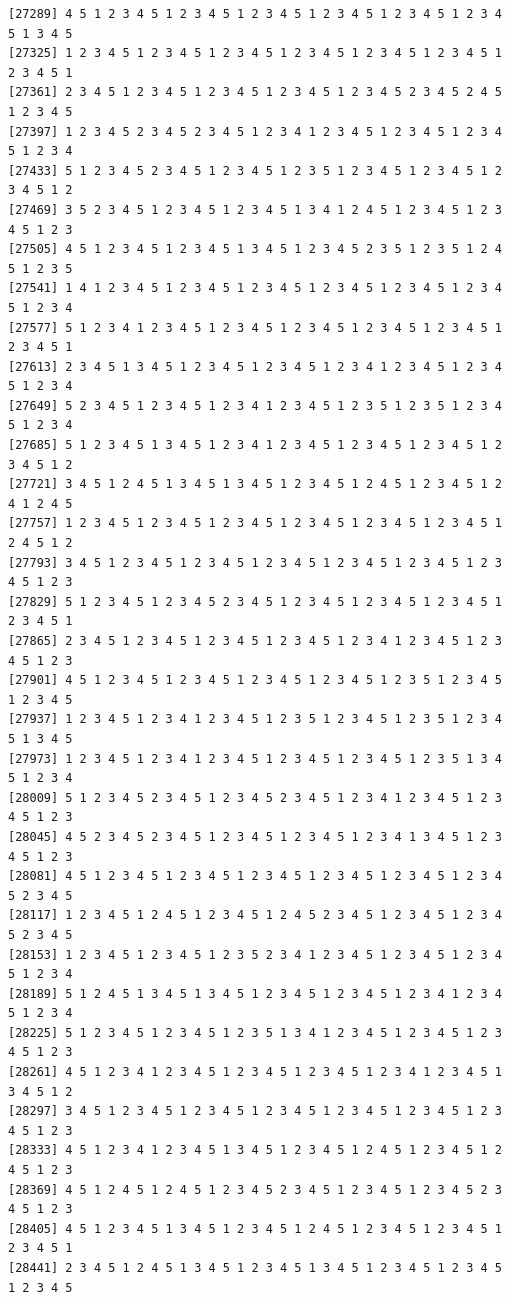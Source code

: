 \documentclass[
  11pt,
]{book}
\begin{document}
\begin{verbatim}
[27289] 4 5 1 2 3 4 5 1 2 3 4 5 1 2 3 4 5 1 2 3 4 5 1 2 3 4 5 1 2 3 4 5 1 3 4 5
[27325] 1 2 3 4 5 1 2 3 4 5 1 2 3 4 5 1 2 3 4 5 1 2 3 4 5 1 2 3 4 5 1 2 3 4 5 1
[27361] 2 3 4 5 1 2 3 4 5 1 2 3 4 5 1 2 3 4 5 1 2 3 4 5 2 3 4 5 2 4 5 1 2 3 4 5
[27397] 1 2 3 4 5 2 3 4 5 2 3 4 5 1 2 3 4 1 2 3 4 5 1 2 3 4 5 1 2 3 4 5 1 2 3 4
[27433] 5 1 2 3 4 5 2 3 4 5 1 2 3 4 5 1 2 3 5 1 2 3 4 5 1 2 3 4 5 1 2 3 4 5 1 2
[27469] 3 5 2 3 4 5 1 2 3 4 5 1 2 3 4 5 1 3 4 1 2 4 5 1 2 3 4 5 1 2 3 4 5 1 2 3
[27505] 4 5 1 2 3 4 5 1 2 3 4 5 1 3 4 5 1 2 3 4 5 2 3 5 1 2 3 5 1 2 4 5 1 2 3 5
[27541] 1 4 1 2 3 4 5 1 2 3 4 5 1 2 3 4 5 1 2 3 4 5 1 2 3 4 5 1 2 3 4 5 1 2 3 4
[27577] 5 1 2 3 4 1 2 3 4 5 1 2 3 4 5 1 2 3 4 5 1 2 3 4 5 1 2 3 4 5 1 2 3 4 5 1
[27613] 2 3 4 5 1 3 4 5 1 2 3 4 5 1 2 3 4 5 1 2 3 4 1 2 3 4 5 1 2 3 4 5 1 2 3 4
[27649] 5 2 3 4 5 1 2 3 4 5 1 2 3 4 1 2 3 4 5 1 2 3 5 1 2 3 5 1 2 3 4 5 1 2 3 4
[27685] 5 1 2 3 4 5 1 3 4 5 1 2 3 4 1 2 3 4 5 1 2 3 4 5 1 2 3 4 5 1 2 3 4 5 1 2
[27721] 3 4 5 1 2 4 5 1 3 4 5 1 3 4 5 1 2 3 4 5 1 2 4 5 1 2 3 4 5 1 2 4 1 2 4 5
[27757] 1 2 3 4 5 1 2 3 4 5 1 2 3 4 5 1 2 3 4 5 1 2 3 4 5 1 2 3 4 5 1 2 4 5 1 2
[27793] 3 4 5 1 2 3 4 5 1 2 3 4 5 1 2 3 4 5 1 2 3 4 5 1 2 3 4 5 1 2 3 4 5 1 2 3
[27829] 5 1 2 3 4 5 1 2 3 4 5 2 3 4 5 1 2 3 4 5 1 2 3 4 5 1 2 3 4 5 1 2 3 4 5 1
[27865] 2 3 4 5 1 2 3 4 5 1 2 3 4 5 1 2 3 4 5 1 2 3 4 1 2 3 4 5 1 2 3 4 5 1 2 3
[27901] 4 5 1 2 3 4 5 1 2 3 4 5 1 2 3 4 5 1 2 3 4 5 1 2 3 5 1 2 3 4 5 1 2 3 4 5
[27937] 1 2 3 4 5 1 2 3 4 1 2 3 4 5 1 2 3 5 1 2 3 4 5 1 2 3 5 1 2 3 4 5 1 3 4 5
[27973] 1 2 3 4 5 1 2 3 4 1 2 3 4 5 1 2 3 4 5 1 2 3 4 5 1 2 3 5 1 3 4 5 1 2 3 4
[28009] 5 1 2 3 4 5 2 3 4 5 1 2 3 4 5 2 3 4 5 1 2 3 4 1 2 3 4 5 1 2 3 4 5 1 2 3
[28045] 4 5 2 3 4 5 2 3 4 5 1 2 3 4 5 1 2 3 4 5 1 2 3 4 1 3 4 5 1 2 3 4 5 1 2 3
[28081] 4 5 1 2 3 4 5 1 2 3 4 5 1 2 3 4 5 1 2 3 4 5 1 2 3 4 5 1 2 3 4 5 2 3 4 5
[28117] 1 2 3 4 5 1 2 4 5 1 2 3 4 5 1 2 4 5 2 3 4 5 1 2 3 4 5 1 2 3 4 5 2 3 4 5
[28153] 1 2 3 4 5 1 2 3 4 5 1 2 3 5 2 3 4 1 2 3 4 5 1 2 3 4 5 1 2 3 4 5 1 2 3 4
[28189] 5 1 2 4 5 1 3 4 5 1 3 4 5 1 2 3 4 5 1 2 3 4 5 1 2 3 4 1 2 3 4 5 1 2 3 4
[28225] 5 1 2 3 4 5 1 2 3 4 5 1 2 3 5 1 3 4 1 2 3 4 5 1 2 3 4 5 1 2 3 4 5 1 2 3
[28261] 4 5 1 2 3 4 1 2 3 4 5 1 2 3 4 5 1 2 3 4 5 1 2 3 4 1 2 3 4 5 1 3 4 5 1 2
[28297] 3 4 5 1 2 3 4 5 1 2 3 4 5 1 2 3 4 5 1 2 3 4 5 1 2 3 4 5 1 2 3 4 5 1 2 3
[28333] 4 5 1 2 3 4 1 2 3 4 5 1 3 4 5 1 2 3 4 5 1 2 4 5 1 2 3 4 5 1 2 4 5 1 2 3
[28369] 4 5 1 2 4 5 1 2 4 5 1 2 3 4 5 2 3 4 5 1 2 3 4 5 1 2 3 4 5 2 3 4 5 1 2 3
[28405] 4 5 1 2 3 4 5 1 3 4 5 1 2 3 4 5 1 2 4 5 1 2 3 4 5 1 2 3 4 5 1 2 3 4 5 1
[28441] 2 3 4 5 1 2 4 5 1 3 4 5 1 2 3 4 5 1 3 4 5 1 2 3 4 5 1 2 3 4 5 1 2 3 4 5

\end{verbatim}
\end{document}
